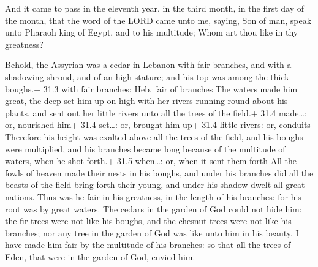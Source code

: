  And it came to pass in the eleventh year, in the third
month, in the first day of the month, that the word of the LORD came
unto me, saying,  Son of man, speak unto Pharaoh king of
Egypt, and to his multitude; Whom art thou like in thy greatness?

 Behold, the Assyrian was a cedar in Lebanon with fair
branches, and with a shadowing shroud, and of an high stature; and his
top was among the thick boughs.+ 31.3 with fair branches: Heb. fair of
branches  The waters made him great, the deep set him up on
high with her rivers running round about his plants, and sent out her
little rivers unto all the trees of the field.+ 31.4 made\ldots: or,
nourished him+ 31.4 set\ldots: or, brought him up+ 31.4 little rivers:
or, conduits  Therefore his height was exalted above all the
trees of the field, and his boughs were multiplied, and his branches
became long because of the multitude of waters, when he shot forth.+
31.5 when\ldots: or, when it sent them forth  All the fowls
of heaven made their nests in his boughs, and under his branches did all
the beasts of the field bring forth their young, and under his shadow
dwelt all great nations.  Thus was he fair in his greatness,
in the length of his branches: for his root was by great waters.
 The cedars in the garden of God could not hide him: the fir
trees were not like his boughs, and the chesnut trees were not like his
branches; nor any tree in the garden of God was like unto him in his
beauty.  I have made him fair by the multitude of his
branches: so that all the trees of Eden, that were in the garden of God,
envied him.

